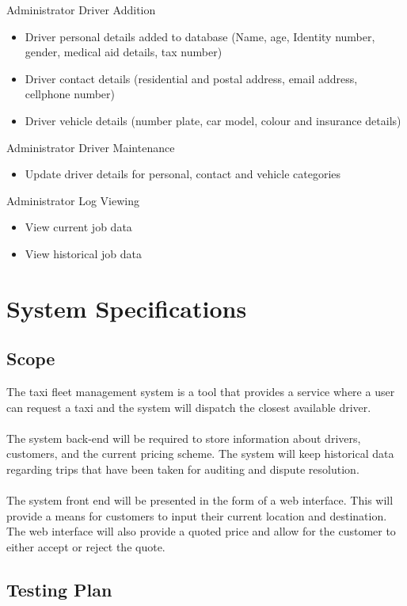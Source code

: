 \documentclass[10pt,twocolumn]{witseiepaper}
\begin{document}
Administrator Driver Addition
\begin{itemize}
\item Driver personal details added to database (Name, age, Identity number, gender, medical aid details, tax number)
\item Driver contact details (residential and postal address, email address, cellphone number)
\item Driver vehicle details (number plate, car model, colour and insurance details)
\end{itemize}
Administrator Driver Maintenance
\begin{itemize}
\item Update driver details for personal, contact and vehicle categories
\end{itemize}
Administrator Log Viewing
\begin{itemize}
\item View current job data
\item View historical job data
\end{itemize}

\section{System Specifications}
\subsection{Scope}

The taxi fleet management system is a tool that provides a service where a user can request a taxi and the system will dispatch the closest available driver.\\\\
The system back-end will be required to store information about drivers, customers, and the current pricing scheme. The system will keep historical data regarding trips that have been taken for auditing and dispute resolution.\\\\
The system front end will be presented in the form of a web interface. This will provide a means for customers to input their current location and destination. The web interface will also provide a quoted price and allow for the customer to either accept or reject the quote.

\subsection{Testing Plan}
\end{document}
